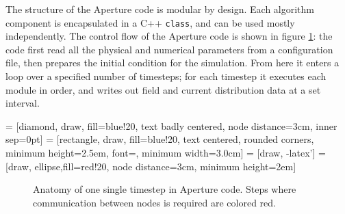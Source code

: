The structure of the Aperture code is modular by design. Each algorithm
component is encapsulated in a C++ \verb!class!, and can be used mostly
independently. The control flow of the Aperture code is shown in figure
\ref{fig:aperture-flow}: the code first read all the physical and numerical
parameters from a configuration file, then prepares the initial condition for
the simulation. From here it enters a loop over a specified number of timesteps;
for each timestep it executes each module in order, and writes out field and
current distribution data at a set interval.

 = [diamond, draw, fill=blue!20,
    text badly centered, node distance=3cm, inner sep=0pt]
 = [rectangle, draw, fill=blue!20,
text centered, rounded corners, minimum height=2.5em,
font=\small\sffamily, minimum width=3.0cm]
 = [draw, -latex']
 = [draw, ellipse,fill=red!20, node distance=3cm,
    minimum height=2em]
\begin{figure}[h]
  \centering
  \caption[Anatomy of one single timestep in Aperture code.]{Anatomy of one
    single timestep in Aperture code. Steps where communication between nodes is
    required are colored red.}
  \label{fig:aperture-flow}
\end{figure}

